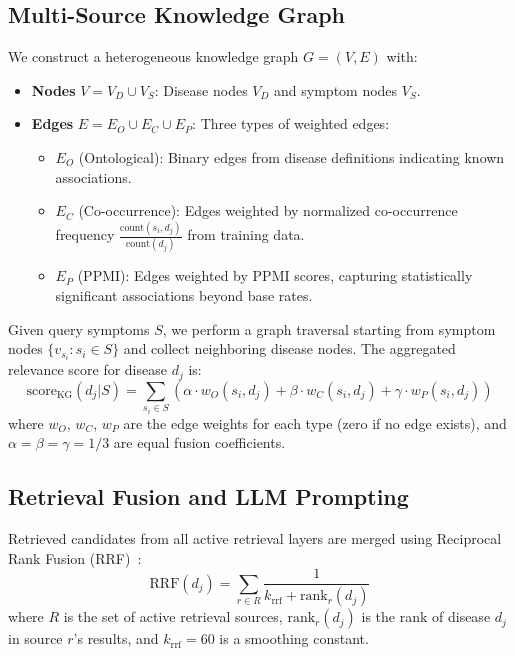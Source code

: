 \documentclass[preprint,12pt]{elsarticle}
\begin{document}
\subsection{Multi-Source Knowledge Graph}
\label{sec:kg}

We construct a heterogeneous knowledge graph $G = (V, E)$ with:
\begin{itemize}
    \item \textbf{Nodes} $V = V_D \cup V_S$: Disease nodes $V_D$ and symptom nodes $V_S$.
    \item \textbf{Edges} $E = E_O \cup E_C \cup E_P$: Three types of weighted edges:
    \begin{itemize}
        \item $E_O$ (Ontological): Binary edges from disease definitions indicating known associations.
        \item $E_C$ (Co-occurrence): Edges weighted by normalized co-occurrence frequency $\frac{\text{count}(s_i, d_j)}{\text{count}(d_j)}$ from training data.
        \item $E_P$ (PPMI): Edges weighted by PPMI scores, capturing statistically significant associations beyond base rates.
    \end{itemize}
\end{itemize}

Given query symptoms $S$, we perform a graph traversal starting from symptom nodes $\{v_{s_i} : s_i \in S\}$ and collect neighboring disease nodes. The aggregated relevance score for disease $d_j$ is:
\begin{equation}
    \text{score}_{\text{KG}}(d_j | S) = \sum_{s_i \in S} \left(\alpha \cdot w_O(s_i, d_j) + \beta \cdot w_C(s_i, d_j) + \gamma \cdot w_P(s_i, d_j)\right)
\label{eq:kg_score}
\end{equation}
where $w_O$, $w_C$, $w_P$ are the edge weights for each type (zero if no edge exists), and $\alpha = \beta = \gamma = 1/3$ are equal fusion coefficients.

\subsection{Retrieval Fusion and LLM Prompting}
\label{sec:fusion}

Retrieved candidates from all active retrieval layers are merged using Reciprocal Rank Fusion (RRF)~\cite{cormack2009reciprocal}:
\begin{equation}
    \text{RRF}(d_j) = \sum_{r \in R} \frac{1}{k_{\text{rrf}} + \text{rank}_r(d_j)}
\end{equation}
where $R$ is the set of active retrieval sources, $\text{rank}_r(d_j)$ is the rank of disease $d_j$ in source $r$'s results, and $k_{\text{rrf}} = 60$ is a smoothing constant.
\end{document}
